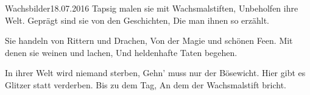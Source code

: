 \begin{poem}{Wachsbilder}{18.07.2016}
Tapsig malen sie mit Wachsmalstiften,
Unbeholfen ihre Welt.
Geprägt sind sie von den Geschichten,
Die man ihnen so erzählt.

Sie handeln von Rittern und Drachen,
Von der Magie und schönen Feen.
Mit denen sie weinen und lachen,
Und heldenhafte Taten begehen.

In ihrer Welt wird niemand sterben,
Gehn' muss nur der Bösewicht.
Hier gibt es Glitzer statt verderben.
Bis zu dem Tag,
An dem der Wachsmalstift bricht.
\end{poem}